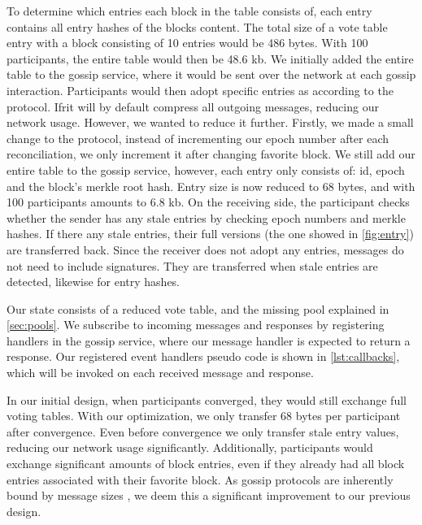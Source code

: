 \documentclass[USenglish]{uit-thesis}
\begin{document}
To determine which entries each block in the table consists of, each entry contains all entry hashes of the blocks content.
The total size of a vote table entry with a block consisting of 10 entries would be 486 bytes.
With 100 participants, the entire table would then be 48.6 \gls{kb}.
We initially added the entire table to the gossip service, where it would be sent over the network at each gossip interaction.
Participants would then adopt specific entries as according to the protocol. 
Ifrit will by default compress all outgoing messages, reducing our network usage. 
However, we wanted to reduce it further.
Firstly, we made a small change to the protocol, instead of incrementing our epoch number after each reconciliation, we only increment it after changing favorite block.
We still add our entire table to the gossip service, however, each entry only consists of: id, epoch and the block's merkle root hash.
Entry size is now reduced to 68 bytes, and with 100 participants amounts to 6.8 \gls{kb}.
On the receiving side, the participant checks whether the sender has any stale entries by checking epoch numbers and merkle hashes.
If there any stale entries, their full versions (the one showed in \autoref{fig:entry}) are transferred back.
Since the receiver does not adopt any entries, messages do not need to include signatures.
They are transferred when stale entries are detected, likewise for entry hashes.   

Our state consists of a reduced vote table, and the missing pool explained in \autoref{sec:pools}.
We subscribe to incoming messages and responses by registering handlers in the gossip service, where our message handler is expected to return a response. 
Our registered event handlers pseudo code is shown in \autoref{lst:callbacks}, which will be invoked on each received message and response.

\begin{code}
\end{code}


In our initial design, when participants converged, they would still exchange full voting tables.
With our optimization, we only transfer 68 bytes per participant after convergence.
Even before convergence we only transfer stale entry values, reducing our network usage significantly.     
Additionally, participants would exchange significant amounts of block entries, even if they already had all block entries associated with their favorite block. 
As gossip protocols are inherently bound by message sizes \cite{gossip_promise}, we deem this a significant improvement to our previous design. 
 
\end{document}
